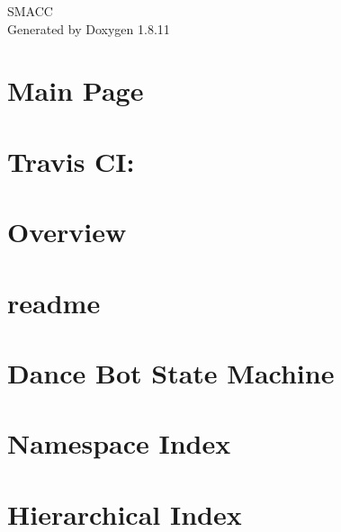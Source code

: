 \documentclass[twoside]{book}
\newcommand{\+}{\discretionary{\mbox{\scriptsize$\hookleftarrow$}}{}{}}
\newcommand{\clearemptydoublepage}{%
  \newpage{\pagestyle{empty}\cleardoublepage}%
}
\begin{document}
\hypersetup{pageanchor=false,
             bookmarksnumbered=true,
             pdfencoding=unicode
            }
\begin{titlepage}
\vspace*{7cm}
\begin{center}%
{\Large S\+M\+A\+CC }\\
\vspace*{1cm}
{\large Generated by Doxygen 1.8.11}\\
\end{center}
\end{titlepage}
\clearemptydoublepage
\tableofcontents
\clearemptydoublepage
{}
\hypersetup{pageanchor=true}

\chapter{Main Page}
\label{index}\hypertarget{index}{}
\chapter{Travis CI\+:}
\label{md_README}
\hypertarget{md_README}{}

\chapter{Overview}
\label{md_rosdoc_lite_README}
\hypertarget{md_rosdoc_lite_README}{}

\chapter{readme}
\label{md_smacc_diagnostics_readme}
\hypertarget{md_smacc_diagnostics_readme}{}

\chapter{Dance Bot State Machine}
\label{md_smacc_sm_reference_library_sm_dance_bot_launch_readme}
\hypertarget{md_smacc_sm_reference_library_sm_dance_bot_launch_readme}{}

\chapter{Namespace Index}

\chapter{Hierarchical Index}

\end{document}
